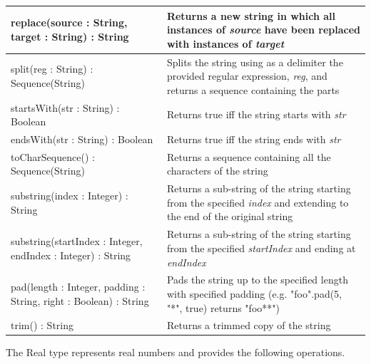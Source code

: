 \begin{longtable} {|p{5.5cm}|p{6.5cm}|}
			replace(source : String, target : String) : String & Returns a new string in which all instances of \emph{source} have been replaced with instances of \emph{target}\\\hline 
			
			split(reg : String) : Sequence(String) & Splits the string using as a delimiter the provided regular expression, \emph{reg}, and returns a sequence containing the parts\\\hline
			
			startsWith(str : String) : Boolean & Returns true iff the string starts with \emph{str}\\\hline
			
			endsWith(str : String) : Boolean & Returns true iff the string ends with \emph{str}\\\hline
			
			toCharSequence() : Sequence(String) & Returns a sequence containing all the characters of the string\\\hline
			
			substring(index : Integer) : String & Returns a sub-string of the string starting from the specified \emph{index} and extending to the end of the original string\\\hline
			
			substring(startIndex : Integer, endIndex : Integer) : String & Returns a sub-string of the string starting from the specified \emph{startIndex} and ending at \emph{endIndex} \\\hline
			
			pad(length : Integer, padding : String, right : Boolean) : String & Pads the string up to the specified length with specified padding (e.g. "foo".pad(5, "*", true) returns "foo**") \\\hline
			
			trim() : String & Returns a trimmed copy of the string \\\hline			
			
\end{longtable}

The Real type represents real numbers and provides the following operations.

